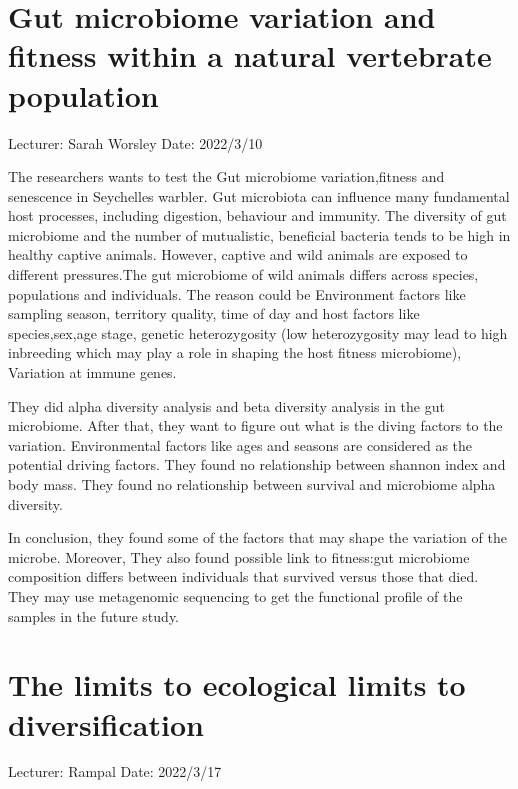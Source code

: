 \documentclass[11pt]{article}
\begin{document}
\section{Gut microbiome variation and fitness within a natural vertebrate population}
Lecturer: Sarah Worsley
\newline
Date: 2022/3/10
\newline

The researchers wants to test the Gut microbiome variation,fitness and senescence in Seychelles warbler. Gut microbiota can influence many fundamental host processes, including digestion, behaviour and immunity. The diversity of gut microbiome and the number of mutualistic, beneficial bacteria tends to be high in healthy captive animals. However, captive and wild animals are exposed to different pressures.The gut microbiome of wild animals differs across species, populations and individuals. The reason could be Environment factors like sampling season, territory quality, time of day and host factors like species,sex,age stage, genetic heterozygosity (low heterozygosity may lead to high inbreeding which may play a role in shaping the host fitness microbiome), Variation at immune genes.

They did alpha diversity analysis and beta diversity analysis in the gut microbiome. After that, they want to figure out what is the diving factors to the variation. Environmental factors like ages and seasons are considered as the potential driving factors. They found no relationship between shannon index and body mass. They found no relationship between survival and microbiome alpha diversity. 

In conclusion, they found some of the factors that may shape the variation of the microbe. Moreover, They also found possible link to fitness:gut microbiome composition differs between individuals that survived versus those that died. They may use metagenomic sequencing to get the functional profile of the samples in the future study.


\newpage

\section{The limits to ecological limits to diversification}
Lecturer: Rampal
\newline
Date: 2022/3/17
\newline
\end{document}
